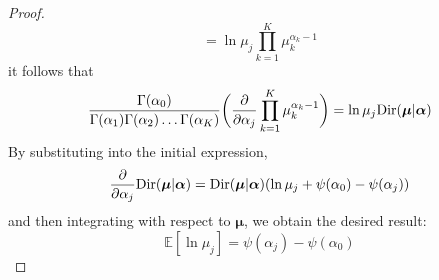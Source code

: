 \begin{proof}
\[        = \ln \mu_j \prod_{k = 1}^K \mu_k^{\alpha_k - 1}
    \] 
    it follows that
    \[
        \frac{\Gamma(\alpha_0)}{\Gamma(\alpha_1)\Gamma(\alpha_2)\ldots\Gamma(\alpha_K)}
        \bigg(\pdv{\alpha_j}\prod_{k = 1}^K \mu_k^{\alpha_k - 1}\bigg)
        = \ln \mu_j \text{Dir}(\bm{\mu} | \bm{\alpha})
    \] 
    By substituting into the initial expression,
    \[
        \pdv{\alpha_j} \text{Dir}(\bm{\mu} | \bm{\alpha})
        = \text{Dir}(\bm{\mu} | \bm{\alpha}) (\ln \mu_j + \psi(\alpha_0) - \psi(\alpha_j))
    \] 
    and then integrating with respect to $\bm{\mu}$, we obtain the 
    desired result:
    \[
        \mathbb{E}[\ln{\mu_j}] = \psi(\alpha_j) - \psi(\alpha_0) 
        \tag{2.276}
    \] 
\end{proof}


